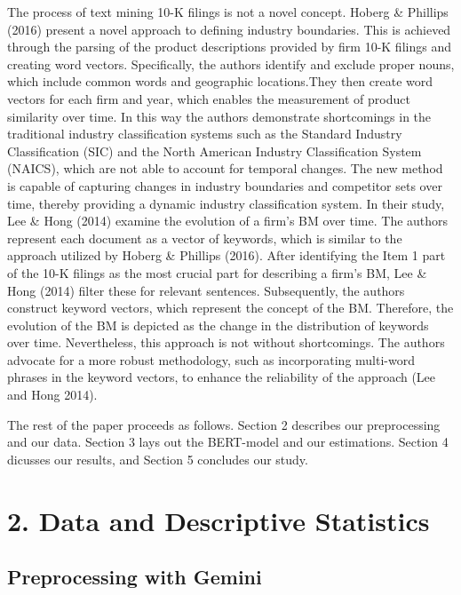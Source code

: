 \documentclass[
]{article}
\begin{document}
The process of text mining 10-K filings is not a novel concept. Hoberg
\& Phillips (2016) present a novel approach to defining industry
boundaries. This is achieved through the parsing of the product
descriptions provided by firm 10-K filings and creating word vectors.
Specifically, the authors identify and exclude proper nouns, which
include common words and geographic locations.They then create word
vectors for each firm and year, which enables the measurement of product
similarity over time. In this way the authors demonstrate shortcomings
in the traditional industry classification systems such as the Standard
Industry Classification (SIC) and the North American Industry
Classification System (NAICS), which are not able to account for
temporal changes. The new method is capable of capturing changes in
industry boundaries and competitor sets over time, thereby providing a
dynamic industry classification system. In their study, Lee \& Hong
(2014) examine the evolution of a firm's BM over time. The authors
represent each document as a vector of keywords, which is similar to the
approach utilized by Hoberg \& Phillips (2016). After identifying the
Item 1 part of the 10-K filings as the most crucial part for describing
a firm's BM, Lee \& Hong (2014) filter these for relevant sentences.
Subsequently, the authors construct keyword vectors, which represent the
concept of the BM. Therefore, the evolution of the BM is depicted as the
change in the distribution of keywords over time. Nevertheless, this
approach is not without shortcomings. The authors advocate for a more
robust methodology, such as incorporating multi-word phrases in the
keyword vectors, to enhance the reliability of the approach (Lee and
Hong 2014).

The rest of the paper proceeds as follows. Section 2 describes our
preprocessing and our data. Section 3 lays out the BERT-model and our
estimations. Section 4 dicusses our results, and Section 5 concludes our
study.

\section{2. Data and Descriptive
Statistics}\label{data-and-descriptive-statistics}

\subsection{Preprocessing with Gemini}\label{preprocessing-with-gemini}
\end{document}
